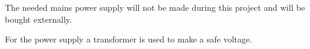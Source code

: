 The needed mains power supply will not be made during this project and will be bought externally.

\noindent For the power supply a transformer is used to make a safe voltage.
